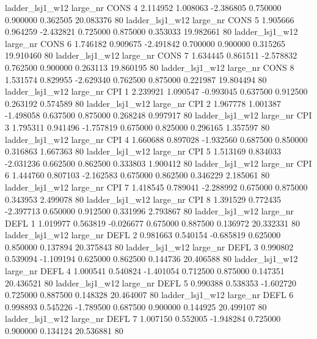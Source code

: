     ladder_lsj1_w12   large_nr     CONS                 4  2.114952  1.008063  -2.386805 0.750000 0.900000  0.362505   20.083376 80
    ladder_lsj1_w12   large_nr     CONS                 5  1.905666  0.964259  -2.432821 0.725000 0.875000  0.353033   19.982661 80
    ladder_lsj1_w12   large_nr     CONS                 6  1.746182  0.909675  -2.491842 0.700000 0.900000  0.315265   19.910460 80
    ladder_lsj1_w12   large_nr     CONS                 7  1.634445  0.861511  -2.578832 0.762500 0.900000  0.263113   19.860195 80
    ladder_lsj1_w12   large_nr     CONS                 8  1.531574  0.829955  -2.629340 0.762500 0.875000  0.221987   19.804494 80
    ladder_lsj1_w12   large_nr      CPI                 1  2.239921  1.090547  -0.993045 0.637500 0.912500  0.263192    0.574589 80
    ladder_lsj1_w12   large_nr      CPI                 2  1.967778  1.001387  -1.498058 0.637500 0.875000  0.268248    0.997917 80
    ladder_lsj1_w12   large_nr      CPI                 3  1.795311  0.941496  -1.757819 0.675000 0.825000  0.296165    1.357597 80
    ladder_lsj1_w12   large_nr      CPI                 4  1.660688  0.897028  -1.932560 0.687500 0.850000  0.316863    1.667363 80
    ladder_lsj1_w12   large_nr      CPI                 5  1.513169  0.834033  -2.031236 0.662500 0.862500  0.333803    1.900412 80
    ladder_lsj1_w12   large_nr      CPI                 6  1.444760  0.807103  -2.162583 0.675000 0.862500  0.346229    2.185061 80
    ladder_lsj1_w12   large_nr      CPI                 7  1.418545  0.789041  -2.288992 0.675000 0.875000  0.343953    2.499078 80
    ladder_lsj1_w12   large_nr      CPI                 8  1.391529  0.772435  -2.397713 0.650000 0.912500  0.331996    2.793867 80
    ladder_lsj1_w12   large_nr     DEFL                 1  1.019977  0.563819  -0.026677 0.675000 0.887500  0.136972   20.332331 80
    ladder_lsj1_w12   large_nr     DEFL                 2  0.981663  0.540154  -0.685819 0.625000 0.850000  0.137894   20.375843 80
    ladder_lsj1_w12   large_nr     DEFL                 3  0.990802  0.539094  -1.109194 0.625000 0.862500  0.144736   20.406588 80
    ladder_lsj1_w12   large_nr     DEFL                 4  1.000541  0.540824  -1.401054 0.712500 0.875000  0.147351   20.436521 80
    ladder_lsj1_w12   large_nr     DEFL                 5  0.990388  0.538353  -1.602720 0.725000 0.887500  0.148328   20.464007 80
    ladder_lsj1_w12   large_nr     DEFL                 6  0.998893  0.545226  -1.789500 0.687500 0.900000  0.144925   20.499107 80
    ladder_lsj1_w12   large_nr     DEFL                 7  1.007150  0.552005  -1.948284 0.725000 0.900000  0.134124   20.536881 80
